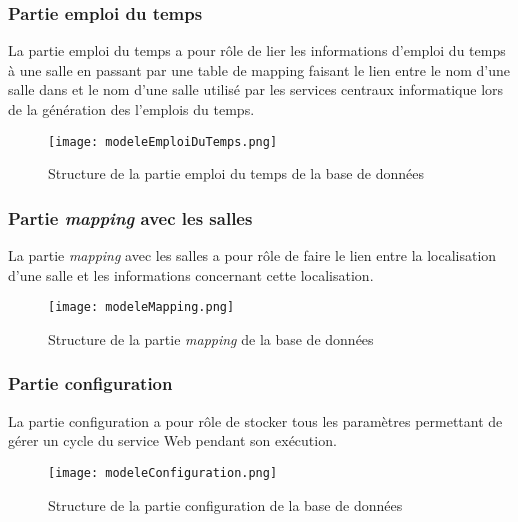 \begin{appendices}
\subsubsection{Partie emploi du temps}

La partie emploi du temps a pour r\^ole de lier les informations d'emploi du temps \`a une salle en passant par une table de mapping faisant le lien entre le nom d'une salle dans {\YuukouII} et le nom d'une salle utilis\'e par les services centraux informatique lors de la g\'en\'eration des l'emplois du temps.

\clearpage

\begin{figure}[!ht]
	\centering
	\texttt{[image: modeleEmploiDuTemps.png]}
	\caption{Structure de la partie emploi du temps de la base de donn\'ees}
	\label{annexe:modeleEmploiDuTemps}

\end{figure}

\subsubsection{Partie \textit{mapping} avec les salles}

La partie \textit{mapping} avec les salles a pour r\^ole de faire le lien entre la localisation d'une salle et les informations concernant cette localisation.

\begin{figure}[!ht]
	\centering
	\texttt{[image: modeleMapping.png]}
	\caption{Structure de la partie \textit{mapping} de la base de donn\'ees}
	\label{annexemodeleMapping}

\end{figure}

\subsubsection{Partie configuration}

La partie configuration a pour r\^ole de stocker tous les param\`etres permettant de g\'erer un cycle du service Web pendant son ex\'ecution.

\begin{figure}[!ht]
	\centering
	\texttt{[image: modeleConfiguration.png]}
	\caption{Structure de la partie configuration de la base de donn\'ees}
	\label{annexe:modeleConfiguration}

\end{figure}


\end{appendices}
